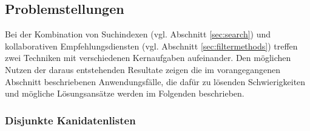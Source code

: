 \subsection{Problemstellungen}

Bei der Kombination von Suchindexen (vgl. Abschnitt \ref{sec:search}) und kollaborativen Empfehlungsdiensten (vgl. Abschnitt \ref{sec:filtermethods}) treffen zwei Techniken mit verschiedenen Kernaufgaben aufeinander. Den möglichen Nutzen der daraus entstehenden Resultate zeigen die im vorangegangenen Abschnitt beschriebenen Anwendungsfälle, die dafür zu lösenden Schwierigkeiten und mögliche Lösungsansätze werden im Folgenden beschrieben.

\subsubsection{Disjunkte Kanidatenlisten}




